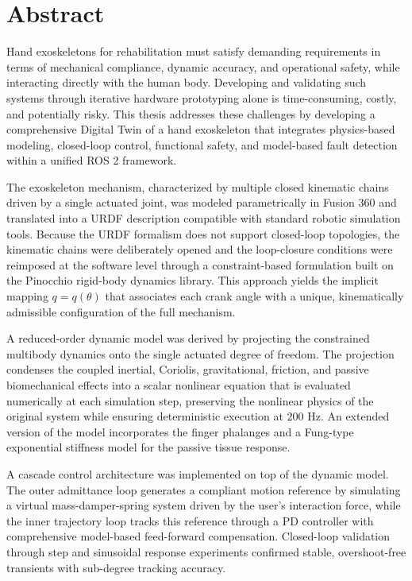 \chapter*{Abstract}

Hand exoskeletons for rehabilitation must satisfy demanding requirements in terms of mechanical compliance, dynamic accuracy, and operational safety, while interacting directly with the human body. Developing and validating such systems through iterative hardware prototyping alone is time-consuming, costly, and potentially risky. This thesis addresses these challenges by developing a comprehensive Digital Twin of a hand exoskeleton that integrates physics-based modeling, closed-loop control, functional safety, and model-based fault detection within a unified ROS 2 framework.
 
The exoskeleton mechanism, characterized by multiple closed kinematic chains driven by a single actuated joint, was modeled parametrically in Fusion 360 and translated into a URDF description compatible with standard robotic simulation tools. Because the URDF formalism does not support closed-loop topologies, the kinematic chains were deliberately opened and the loop-closure conditions were reimposed at the software level through a constraint-based formulation built on the Pinocchio rigid-body dynamics library. This approach yields the implicit mapping $q = q(\theta)$ that associates each crank angle with a unique, kinematically admissible configuration of the full mechanism.
 
A reduced-order dynamic model was derived by projecting the constrained multibody dynamics onto the single actuated degree of freedom. The projection condenses the coupled inertial, Coriolis, gravitational, friction, and passive biomechanical effects into a scalar nonlinear equation that is evaluated numerically at each simulation step, preserving the nonlinear physics of the original system while ensuring deterministic execution at 200 Hz. An extended version of the model incorporates the finger phalanges and a Fung-type exponential stiffness model for the passive tissue response.
 
A cascade control architecture was implemented on top of the dynamic model. The outer admittance loop generates a compliant motion reference by simulating a virtual mass-damper-spring system driven by the user's interaction force, while the inner trajectory loop tracks this reference through a PD controller with comprehensive model-based feed-forward compensation. Closed-loop validation through step and sinusoidal response experiments confirmed stable, overshoot-free transients with sub-degree tracking accuracy.
 
